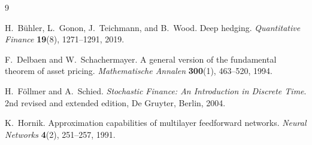 \documentclass[11pt,a4paper]{report}
\numberwithin{equation}{chapter}
\theoremstyle{plain}
\theoremstyle{definition}
\begin{document}
\begin{thebibliography}{9}

    H.~B\"uhler, L.~Gonon, J.~Teichmann, and B.~Wood.
    Deep hedging.
    \emph{Quantitative Finance} \textbf{19}(8), 1271--1291, 2019.

    F.~Delbaen and W.~Schachermayer.
    A general version of the fundamental theorem of asset pricing.
    \emph{Mathematische Annalen} \textbf{300}(1), 463--520, 1994.

    H.~F\"ollmer and A.~Schied.
    \emph{Stochastic Finance: An Introduction in Discrete Time}.
    2nd revised and extended edition, De Gruyter, Berlin, 2004.

    K.~Hornik.
    Approximation capabilities of multilayer feedforward networks.
    \emph{Neural Networks} \textbf{4}(2), 251--257, 1991.

\end{thebibliography}
\end{document}
